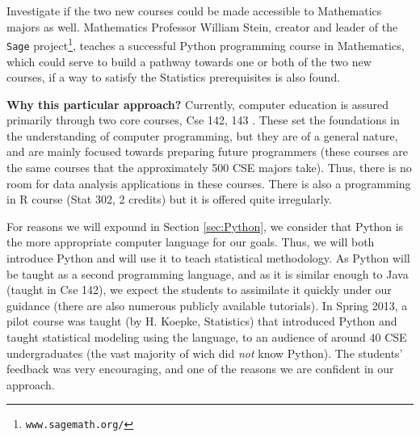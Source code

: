 Investigate if the two new courses could be
made accessible to Mathematics majors as well. Mathematics Professor
William Stein, creator and leader of the {\tt Sage}
project\footnote{{\tt www.sagemath.org/}}, teaches a successful Python
programming course in Mathematics, which could serve to build a
pathway towards one or both of the two new courses, if a way to
satisfy the Statistics prerequisites is also found.


{\bf Why this particular approach?} Currently, computer education is
assured primarily through two core courses, {\sc Cse 142, 143}
\cite{Reges:java}. These set the foundations in the understanding of
computer programming, but they are of a general nature, and are mainly
focused towards preparing future programmers  (these courses are the
same courses that the approximately 500 CSE majors take). Thus, there
is no room for data analysis applications in these courses.  There is
also a programming in R course ({\sc Stat 302}, 2 credits) but it is 
offered quite irregularly.

For reasons we will expound in Section \ref{sec:Python}, we
consider that Python is the more appropriate computer language for our
goals. Thus, we will both introduce Python and will use it to teach
statistical methodology.  As Python will be taught as a second
programming language, and as it is similar enough to Java (taught in
{\sc Cse 142}), we expect the students to assimilate it quickly under our
guidance (there are also numerous publicly available tutorials).
In Spring 2013, a pilot course was taught (by H. Koepke,
Statistics) that introduced Python and taught statistical modeling
using the language, to an audience of around 40 CSE undergraduates
(the vast majority of wich did {\em not} know Python). The students'
feedback was very encouraging, and one of the reasons we are confident
in our approach.


